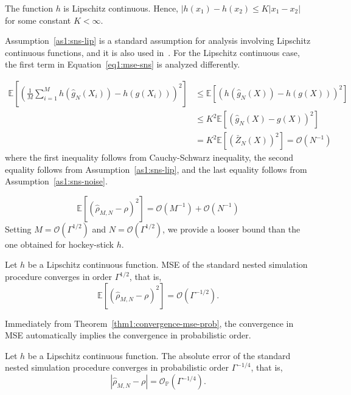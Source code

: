 \begin{assumption} \label{as1:sns-lip}
    The function $h$ is Lipschitz continuous. Hence, $|h(x_1) - h(x_2) \leq K|x_1 - x_2|$ for some constant $K< \infty$.
\end{assumption}
Assumption~\ref{as1:sns-lip} is a standard assumption for analysis involving Lipschitz continuous functions, and it is also used in~\cite{broadie2015risk}.
For the Lipschitz continuous case, the first term in Equation~\ref{eq1:mse-sns} is analyzed differently.

\begin{align}
    \mathbb{E} \left[  \left( \frac{1}{M} \sum_{i=1}^M h\left( \hat{g}_{N}(X_i) \right) -  h\left(g(X_i) \right)  \right)^2\right]    
    & \leq \mathbb{E} \left[ \left( h\left( \hat{g}_{N}(X) \right) -  h\left(g(X) \right)  \right)^2\right]  \nonumber \\
    & \leq K^2 \mathbb{E} \left[ \left( \hat{g}_{N}(X) -  g(X)  \right)^2\right] \nonumber \\
    & = K^2 \mathbb{E} \left[ \left( \bar{Z}_{N}(X) \right)^2\right] = \mathcal{O}(N^{-1})
\end{align}
where the first inequality follows from Cauchy-Schwarz inequality, the second equality follows from Assumption~\ref{as1:sns-lip}, and the last equality follows from Assumption~\ref{as1:sns-noise}.

\begin{equation}
    \mathbb{E} \left[ \left( \hat{\rho}_{M, N} - \rho \right)^2 \right] = \mathcal{O}(M^{-1}) + \mathcal{O}(N^{-1})
\end{equation}
Setting $M = \mathcal{O}(\Gamma^{1/2})$ and $N = \mathcal{O}(\Gamma^{1/2})$, we provide a looser bound than the one obtained for hockey-stick $h$.

\begin{theorem}
    Let $h$ be a Lipschitz continuous function. 
    MSE of the standard nested simulation procedure converges in order $\Gamma^{1/2}$, that is,
    $$\mathbb{E} \left[ \left( \hat{\rho}_{M, N} - \rho \right)^2 \right] = \mathcal{O}(\Gamma^{-1/2}).$$
\end{theorem}

Immediately from Theorem~\ref{thm1:convergence-mse-prob}, the convergence in MSE automatically implies the convergence in probabilistic order.

\begin{corollary}
    Let $h$ be a Lipschitz continuous function. The absolute error of the standard nested simulation procedure converges in probabilistic order $\Gamma^{-1/4}$, that is,
    $$\left| \hat{\rho}_{M, N} - \rho \right| = \mathcal{O}_\mathbb{P}(\Gamma^{-1/4}).$$
\end{corollary}

